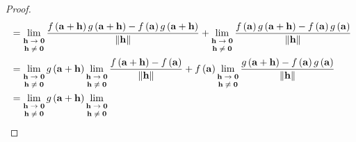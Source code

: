\documentclass[dvipdfmx]{jsarticle}
\begin{document}
\begin{proof}
\begin{align*}
&= \lim_{\scriptsize \begin{matrix}
\mathbf{h} \rightarrow \mathbf{0} \\
\mathbf{h} \neq \mathbf{0} \\
\end{matrix}}\frac{f\left( \mathbf{a} + \mathbf{h} \right)g\left( \mathbf{a} + \mathbf{h} \right) - f\left( \mathbf{a} \right)g\left( \mathbf{a} + \mathbf{h} \right)}{\left\| \mathbf{h} \right\|} + \lim_{\scriptsize \begin{matrix}
\mathbf{h} \rightarrow \mathbf{0} \\
\mathbf{h} \neq \mathbf{0} \\
\end{matrix}}\frac{f\left( \mathbf{a} \right)g\left( \mathbf{a} + \mathbf{h} \right) - f\left( \mathbf{a} \right)g\left( \mathbf{a} \right)}{\left\| \mathbf{h} \right\|}\\
&= \lim_{\scriptsize \begin{matrix}
\mathbf{h} \rightarrow \mathbf{0} \\
\mathbf{h} \neq \mathbf{0} \\
\end{matrix}}{g\left( \mathbf{a} + \mathbf{h} \right)}\lim_{\scriptsize \begin{matrix}
\mathbf{h} \rightarrow \mathbf{0} \\
\mathbf{h} \neq \mathbf{0} \\
\end{matrix}}\frac{f\left( \mathbf{a} + \mathbf{h} \right) - f\left( \mathbf{a} \right)}{\left\| \mathbf{h} \right\|} + f\left( \mathbf{a} \right)\lim_{\scriptsize \begin{matrix}
\mathbf{h} \rightarrow \mathbf{0} \\
\mathbf{h} \neq \mathbf{0} \\
\end{matrix}}\frac{g\left( \mathbf{a} + \mathbf{h} \right) - f\left( \mathbf{a} \right)g\left( \mathbf{a} \right)}{\left\| \mathbf{h} \right\|}\\
&= \lim_{\scriptsize \begin{matrix}
\mathbf{h} \rightarrow \mathbf{0} \\
\mathbf{h} \neq \mathbf{0} \\
\end{matrix}}{g\left( \mathbf{a} + \mathbf{h} \right)}\lim_{\scriptsize \begin{matrix}
\mathbf{h} \rightarrow \mathbf{0} \\
\mathbf{h} \neq \mathbf{0} \\

\end{matrix}}
\end{align*}
\end{proof}
\end{document}
